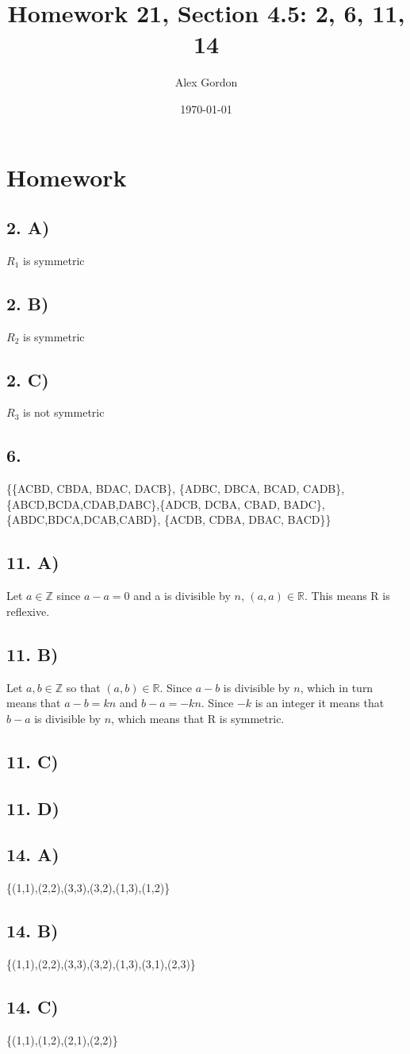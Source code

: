 \documentclass[12]{scrartcl}
\begin{document}
\title{Homework 21, Section 4.5: 2, 6, 11, 14}
\author{Alex Gordon}
\date{\today}
\maketitle
\section*{Homework}
\subsection*{2. A)}
$R_1$ is symmetric
\subsection*{2. B)}
$R_2$ is symmetric
\subsection*{2. C)}
$R_3$ is not symmetric
\subsection*{6.}
\{\{ACBD, CBDA, BDAC, DACB\}, \{ADBC, DBCA, BCAD, CADB\}, \{ABCD,BCDA,CDAB,DABC\},\{ADCB, DCBA, CBAD, BADC\},\{ABDC,BDCA,DCAB,CABD\}, \{ACDB, CDBA, DBAC, BACD\}\}

\subsection*{11. A)}
Let $a \in \mathds{Z} $ since $a - a = 0$ and a is divisible by $n$, $(a,a) \in \mathds{R}$. This means R is reflexive. 
\subsection*{11. B)}
Let $a, b \in \mathds{Z}$ so that $(a,b) \in \mathds{R}$. Since $a - b$ is divisible by $n$, which in turn means that $a - b= kn$ and $b-a= -kn$. Since $-k$ is an integer it means that $b -a$ is divisible by $n$, which means that R is symmetric. 
\subsection*{11. C)}
\subsection*{11. D)}

\subsection*{14. A)}
\{(1,1),(2,2),(3,3),(3,2),(1,3),(1,2)\}
\subsection*{14. B)}
\{(1,1),(2,2),(3,3),(3,2),(1,3),(3,1),(2,3)\}
\subsection*{14. C)}
\{(1,1),(1,2),(2,1),(2,2)\}
\end{document}
